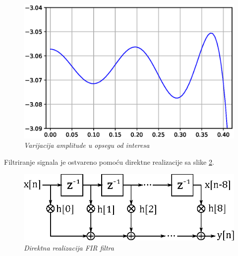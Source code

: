 \documentclass[conference]{IEEEtran}
\begin{document}
\begin{figure}[h]
	\centering
	\includegraphics[scale=0.5]{./slike/maxVar.eps}
	\caption{\textsl{Varijacija amplitude u opsegu od interesa}}
	\label{slika:maxVar}
\end{figure}

Filtriranje signala je ostvareno pomoću direktne realizacije sa slike \ref{slika:FIRreal}.

\begin{figure}[h]
	\centering
	\includegraphics[scale=0.7]{./slike/FIRreal.eps}
	\caption{\textsl{Direktna realizacija FIR filtra}}
	\label{slika:FIRreal}
\end{figure}

\end{document}
